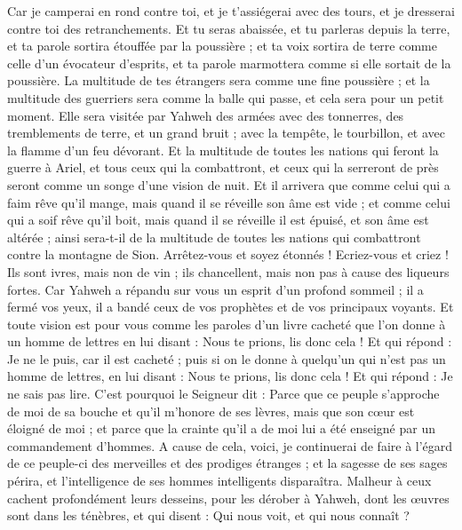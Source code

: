 \begin{multicols}{2}
Car je camperai en rond contre toi, et je t'assiégerai avec des tours, et je dresserai contre toi des retranchements.
Et tu seras abaissée, et tu parleras depuis la terre, et ta parole sortira étouffée par la poussière ; et ta voix sortira de terre comme celle d'un évocateur d'esprits, et ta parole marmottera comme si elle sortait de la poussière.
La multitude de tes étrangers sera comme une fine poussière ; et la multitude des guerriers sera comme la balle qui passe, et cela sera pour un petit moment.
Elle sera visitée par Yahweh des armées avec des tonnerres, des tremblements de terre, et un grand bruit ; avec la tempête, le tourbillon, et avec la flamme d'un feu dévorant.
Et la multitude de toutes les nations qui feront la guerre à Ariel, et tous ceux qui la combattront, et ceux qui la serreront de près seront comme un songe d'une vision de nuit.
Et il arrivera que comme celui qui a faim rêve qu'il mange, mais quand il se réveille son âme est vide ; et comme celui qui a soif rêve qu'il boit, mais quand il se réveille il est épuisé, et son âme est altérée ; ainsi sera-t-il de la multitude de toutes les nations qui combattront contre la montagne de Sion.
Arrêtez-vous et soyez étonnés ! Ecriez-vous et criez ! Ils sont ivres, mais non de vin ; ils chancellent, mais non pas à cause des liqueurs fortes.
Car Yahweh a répandu sur vous un esprit d'un profond sommeil ; il a fermé vos yeux, il a bandé ceux de vos prophètes et de vos principaux voyants.
Et toute vision est pour vous comme les paroles d'un livre cacheté que l'on donne à un homme de lettres en lui disant : Nous te prions, lis donc cela ! Et qui répond : Je ne le puis, car il est cacheté ;
puis si on le donne à quelqu'un qui n'est pas un homme de lettres, en lui disant : Nous te prions, lis donc cela ! Et qui répond : Je ne sais pas lire.
C'est pourquoi le Seigneur dit : Parce que ce peuple s'approche de moi de sa bouche et qu'il m'honore de ses lèvres, mais que son cœur est éloigné de moi ; et parce que la crainte qu'il a de moi lui a été enseigné par un commandement d'hommes.
A cause de cela, voici, je continuerai de faire à l'égard de ce peuple-ci des merveilles et des prodiges étranges ; et la sagesse de ses sages périra, et l'intelligence de ses hommes intelligents disparaîtra.
Malheur à ceux cachent profondément leurs desseins, pour les dérober à Yahweh, dont les œuvres sont dans les ténèbres, et qui disent : Qui nous voit, et qui nous connaît ?

\end{multicols}
